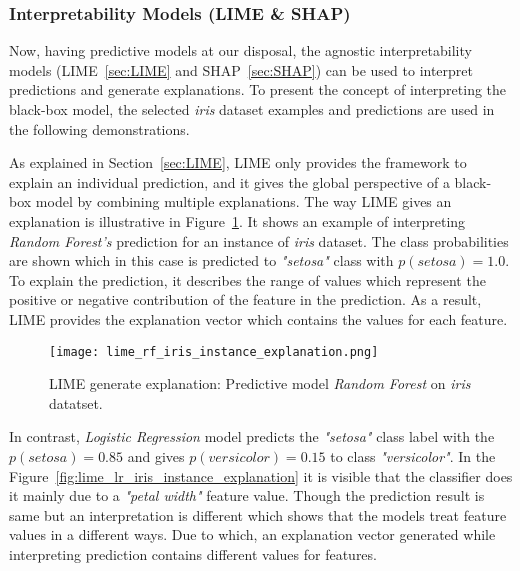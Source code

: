 \documentclass[english]{tktltiki2}
\theoremstyle{definition}
\theoremstyle{remark}
\begin{document}
\subsubsection{Interpretability Models (LIME \& SHAP)}
Now, having predictive models at our disposal, the agnostic interpretability models (LIME~\ref{sec:LIME} and SHAP~\ref{sec:SHAP}) can be used to interpret predictions and generate explanations. To present the concept of interpreting the black-box model, the selected \textit{iris} dataset examples and predictions are used in the following demonstrations.

As explained in Section~\ref{sec:LIME}, LIME only provides the framework to explain an individual prediction, and it gives the global perspective of a black-box model by combining multiple explanations. The way LIME gives an explanation is illustrative in Figure~\ref{fig:lime_rf_iris_instance_explanation}. It shows an example of interpreting \textit{Random Forest's} prediction for an instance of \textit{iris} dataset. The class probabilities are shown which in this case is predicted to \textit{"setosa"} class with $p(setosa)=1.0$. To explain the prediction, it describes the range of values which represent the positive or negative contribution of the feature in the prediction. As a result, LIME provides the explanation vector which contains the values for each feature.

\begin{figure}[H]
	\centering
	\vspace*{5mm}
	\texttt{[image: lime\_rf\_iris\_instance\_explanation.png]}
	\caption{LIME generate explanation: Predictive model \textit{Random Forest} on \textit{iris} datatset.}
	\label{fig:lime_rf_iris_instance_explanation}
\end{figure} 
In contrast, \textit{Logistic Regression} model predicts the \textit{"setosa"} class label with the $p(setosa) = 0.85$ and gives $p(versicolor) = 0.15$ to class \textit{"versicolor"}. In the Figure~\ref{fig:lime_lr_iris_instance_explanation} it is visible that the classifier does it mainly due to a \textit{"petal width"} feature value. Though the prediction result is same but an interpretation is different which shows that the models treat feature values in a different ways. Due to which, an explanation vector generated while interpreting prediction contains different values for features.
\end{document}
